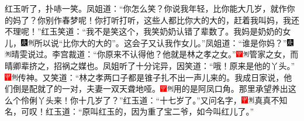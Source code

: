 红玉听了，扑哧一笑。凤姐道：``你怎么笑？你说我年轻，比你能大几岁，就作你的妈了？你别作春梦呢！你打听打听，这些人都比你大的大的，赶着我叫妈，我还不理呢！''红玉笑道：``我不是笑这个，我笑奶奶认错了辈数了。我妈是奶奶的女儿，{\includegraphics[width=3mm]{../Images/00004}\includegraphics[width=3mm]{../Images/00011}\footnotesize \kaishu 所以说``比你大的大的''。}这会子又认我作女儿。''凤姐道：``谁是你妈？''{\includegraphics[width=3mm]{../Images/00004}\includegraphics[width=3mm]{../Images/00011}\footnotesize \kaishu 晴雯说过。}李宫裁道：``你原来不认得他？他就是林之孝之女。''{\includegraphics[width=3mm]{../Images/00002}\includegraphics[width=3mm]{../Images/00011}\footnotesize \kaishu 管家之女，而晴卿辈挤之，招祸之媒也。}凤姐听了十分诧异，因笑道：``哦！原来是他的丫头。''{\includegraphics[width=3mm]{../Images/00002}\includegraphics[width=3mm]{../Images/00011}\footnotesize \kaishu 传神。}又笑道：``林之孝两口子都是锥子扎不出一声儿来的。我成日家说，他们倒是配就了的一对，夫妻一双天聋地哑。{\includegraphics[width=3mm]{../Images/00002}\includegraphics[width=3mm]{../Images/00011}\footnotesize \kaishu 用的是阿凤口角。}那里承望养出这么个伶俐丫头来！你十几岁了？''红玉道：``十七岁了。''又问名字，{\includegraphics[width=3mm]{../Images/00002}\includegraphics[width=3mm]{../Images/00011}\footnotesize \kaishu 真真不知名，可叹！}红玉道：``原叫红玉的，因为重了宝二爷，如今叫红儿了。''

